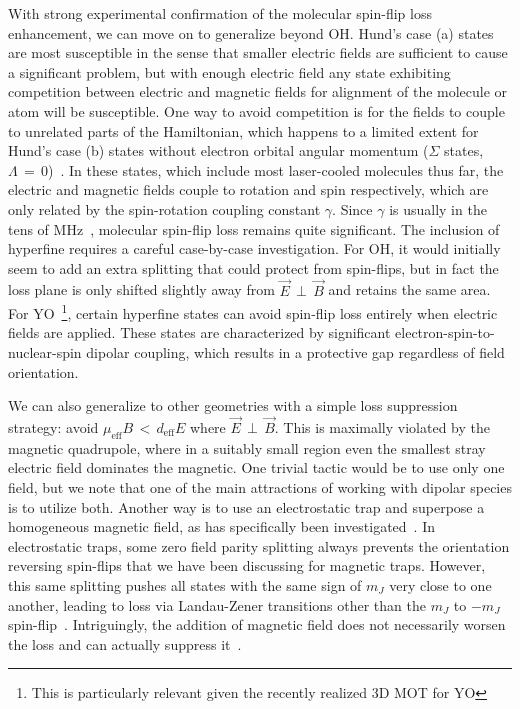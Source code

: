 \documentclass[%
 reprint,
 amsmath,amssymb,
 aps,
prl,
]{revtex4-1}
\newcommand{\epb}{{$\vec{E}\,{\perp}\,\vec{B}$}}
\begin{document}
With strong experimental confirmation of the molecular spin-flip loss enhancement, we can move on to generalize beyond OH.
Hund's case (a) states are most susceptible in the sense that smaller electric fields are sufficient to cause a significant problem, but with enough electric field any state exhibiting competition between electric and magnetic fields for alignment of the molecule or atom will be susceptible. 
One way to avoid competition is for the fields to couple to unrelated parts of the Hamiltonian, which happens to a limited extent for Hund's case (b) states without electron orbital angular momentum ($\Sigma$ states, $\Lambda\,{=}\,0$)~\cite{Bohn2013}. 
In these states, which include most laser-cooled molecules thus far, the electric and magnetic fields couple to rotation and spin respectively, which are only related by the spin-rotation coupling constant $\gamma$.
Since $\gamma$ is usually in the tens of MHz~\cite{Quemener2016}, molecular spin-flip loss remains quite significant.
The inclusion of hyperfine requires a careful case-by-case investigation. For OH, it would initially seem to add an extra splitting that could protect from spin-flips, but in fact the loss plane is only shifted slightly away from \epb{} and retains the same area.
For YO~\footnote{This is particularly relevant given the recently realized 3D MOT for YO}, certain hyperfine states can avoid spin-flip loss entirely when electric fields are applied. 
These states are characterized by significant electron-spin-to-nuclear-spin dipolar coupling, which results in a protective gap regardless of field orientation. %

We can also generalize to other geometries with a simple loss suppression strategy: avoid $\mu_\text{eff}B \,{<}\, d_\text{eff}E$ where \epb.
This is maximally violated by the magnetic quadrupole, where in a suitably small region even the smallest stray electric field dominates the magnetic.
One trivial tactic would be to use only one field, but we note that one of the main attractions of working with dipolar species is to utilize both.
Another way is to use an electrostatic trap and superpose a homogeneous magnetic field, as has specifically been investigated~\cite{Meek2011}.
In electrostatic traps, some zero field parity splitting always prevents the orientation reversing spin-flips that we have been discussing for magnetic traps. 
However, this same splitting pushes all states with the same sign of $m_J$ very close to one another, leading to loss via Landau-Zener transitions other than the $m_J$ to $-m_J$ spin-flip~\cite{Wall2010}.
Intriguingly, the addition of magnetic field does not necessarily worsen the loss and can actually suppress it~\cite{Meek2011}.
\end{document}
